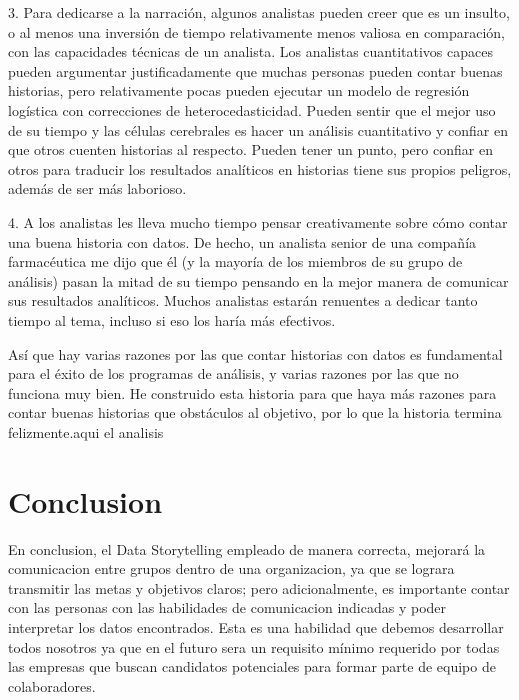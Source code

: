 \documentclass[preprint,12pt]{elsarticle}
\begin{document}
3. Para dedicarse a la narración, algunos analistas pueden creer que es un insulto, o al menos una inversión de tiempo relativamente menos valiosa en comparación, con las capacidades técnicas de un analista. Los analistas cuantitativos capaces pueden argumentar justificadamente que muchas personas pueden contar buenas historias, pero relativamente pocas pueden ejecutar un modelo de regresión logística con correcciones de heterocedasticidad. Pueden sentir que el mejor uso de su tiempo y las células cerebrales es hacer un análisis cuantitativo y confiar en que otros cuenten historias al respecto. Pueden tener un punto, pero confiar en otros para traducir los resultados analíticos en historias tiene sus propios peligros, además de ser más laborioso. \hfill \break

4. A los analistas les lleva mucho tiempo pensar creativamente sobre cómo contar una buena historia con datos. De hecho, un analista senior de una compañía farmacéutica me dijo que él (y la mayoría de los miembros de su grupo de análisis) pasan la mitad de su tiempo pensando en la mejor manera de comunicar sus resultados analíticos. Muchos analistas estarán renuentes a dedicar tanto tiempo al tema, incluso si eso los haría más efectivos. \hfill \break

Así que hay varias razones por las que contar historias con datos es fundamental para el éxito de los programas de análisis, y varias razones por las que no funciona muy bien. He construido esta historia para que haya más razones para contar buenas historias que obstáculos al objetivo, por lo que la historia termina felizmente.aqui el analisis \hfill \break

\newpage

	
	
\section{Conclusion}
En conclusion, el Data Storytelling empleado de manera correcta, mejorará la comunicacion entre grupos dentro de una organizacion, ya que se lograra transmitir las metas y objetivos claros; pero adicionalmente, es importante contar con las personas con las habilidades de comunicacion indicadas y poder interpretar los datos encontrados. Esta es una habilidad que debemos desarrollar todos nosotros ya que en el futuro sera un requisito mínimo requerido por todas las empresas que buscan candidatos potenciales para formar parte de equipo de colaboradores.
\end{document}
